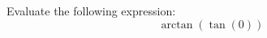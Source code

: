 \documentclass{ximera}
\author{David Kish}
\begin{document}
\begin{exercise}
Evaluate the following expression:
\[
\arctan(\tan(0))
\]
\begin{multipleChoice}
\end{multipleChoice}
\end{exercise}
\end{document}
